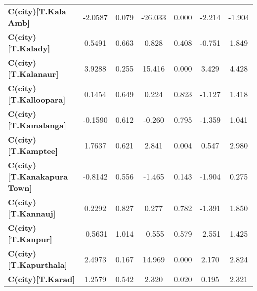 \begin{center}
\begin{tabular}{lcccccc}
\textbf{C(city)[T.Kala Amb]}                                                                        &      -2.0587  &        0.079     &   -26.033  &         0.000        &       -2.214    &       -1.904     \\
\textbf{C(city)[T.Kalady]}                                                                          &       0.5491  &        0.663     &     0.828  &         0.408        &       -0.751    &        1.849     \\
\textbf{C(city)[T.Kalanaur]}                                                                        &       3.9288  &        0.255     &    15.416  &         0.000        &        3.429    &        4.428     \\
\textbf{C(city)[T.Kalloopara]}                                                                      &       0.1454  &        0.649     &     0.224  &         0.823        &       -1.127    &        1.418     \\
\textbf{C(city)[T.Kamalanga]}                                                                       &      -0.1590  &        0.612     &    -0.260  &         0.795        &       -1.359    &        1.041     \\
\textbf{C(city)[T.Kamptee]}                                                                         &       1.7637  &        0.621     &     2.841  &         0.004        &        0.547    &        2.980     \\
\textbf{C(city)[T.Kanakapura Town]}                                                                 &      -0.8142  &        0.556     &    -1.465  &         0.143        &       -1.904    &        0.275     \\
\textbf{C(city)[T.Kannauj]}                                                                         &       0.2292  &        0.827     &     0.277  &         0.782        &       -1.391    &        1.850     \\
\textbf{C(city)[T.Kanpur]}                                                                          &      -0.5631  &        1.014     &    -0.555  &         0.579        &       -2.551    &        1.425     \\
\textbf{C(city)[T.Kapurthala]}                                                                      &       2.4973  &        0.167     &    14.969  &         0.000        &        2.170    &        2.824     \\
\textbf{C(city)[T.Karad]}                                                                           &       1.2579  &        0.542     &     2.320  &         0.020        &        0.195    &        2.321     \\

\end{tabular}
\end{center}
